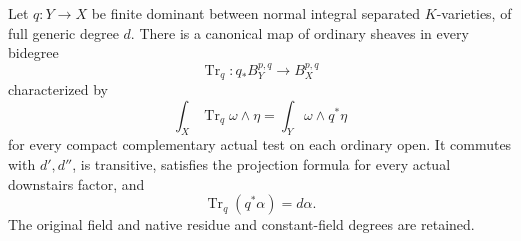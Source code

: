 \begin{theorem}
\label{r16ft:full-trace}
Let $q:Y\to X$ be finite dominant between normal integral separated
$K$-varieties, of full generic degree $d$. There is a canonical map of
ordinary sheaves in every bidegree
\[
 \operatorname{Tr}_q:q_*B_Y^{p,q}\longrightarrow B_X^{p,q}
 \tag{FT16.7}\label{r16ft:trace-map}
\]
characterized by
\[
 \int_X\operatorname{Tr}_q\omega\wedge\eta
       =\int_Y\omega\wedge q^*\eta
 \tag{FT16.8}\label{r16ft:trace-pairing}
\]
for every compact complementary actual test on each ordinary open.
It commutes with $d',d''$, is transitive, satisfies the projection
formula for every actual downstairs factor, and
\[
             \operatorname{Tr}_q(q^*\alpha)=d\alpha.
 \tag{FT16.9}\label{r16ft:degree}
\]
The original field and native residue and constant-field degrees are
retained.
\end{theorem}

